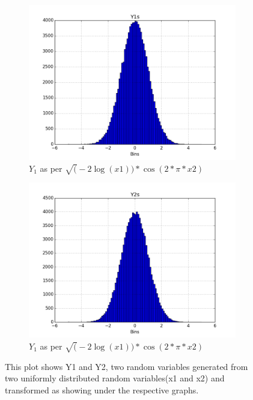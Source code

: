 \documentclass[a4paper,11pt]{article}
\begin{document}
\begin{figure}[ht]
    \begin{subfigure}{.5 \textwidth}
	\centering
    \includegraphics[scale=0.40]{figure3_y1s.png}
    \caption{$Y_1$ as per $\sqrt(-2\log(x1))*\cos(2*\pi*x2)$}
	\label{fig:Y1}
\end{subfigure}
    \begin{subfigure}{.5 \textwidth}
	\centering
    \includegraphics[scale=0.40]{figure3_y2s.png}
    \caption{$Y_1$ as per $\sqrt(-2\log(x1))*\cos(2*\pi*x2)$}
	\label{fig:Y1}
\end{subfigure}
    \caption{This plot shows Y1 and Y2, two random variables generated from two uniformly distributed random variables(x1 and x2) and transformed as showing under the respective graphs.}
\end{figure}
\end{document}
